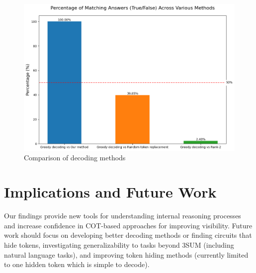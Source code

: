 \documentclass[10pt,a4paper]{article}
\begin{document}
\begin{figure}[h]
\centering
\includegraphics[width=\textwidth]{token_comparison_percentages.png}
\caption{Comparison of decoding methods}
\label{fig:decoding_comparison}
\end{figure}

\section{Implications and Future Work}
Our findings provide new tools for understanding internal reasoning processes and increase confidence in COT-based approaches for improving visibility. Future work should focus on developing better decoding methods or finding circuits that hide tokens, investigating generalizability to tasks beyond 3SUM (including natural language tasks), and improving token hiding methods (currently limited to one hidden token which is simple to decode).

\clearpage
\end{document}
